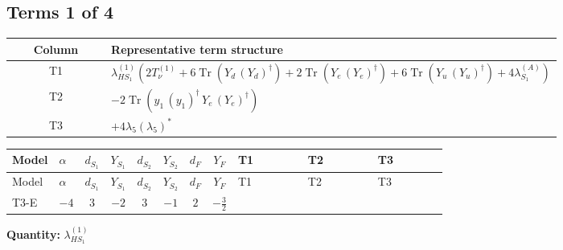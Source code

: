 \documentclass[8pt]{article}
\begin{document}
\begin{landscape}
\subsection*{Terms 1 of 4}
\begin{center}
\begin{tabular}{@{}c >{\raggedright\arraybackslash}p{0.82\linewidth}@{}}
\toprule
Column & Representative term structure \\
\midrule
T1 & \(\displaystyle {\lambda_{HS_1}^{(1)}} (2 T_{\nu}^{(1)}+6 \operatorname{Tr}\!\left({Y_d}\,\left({Y_d}\right)^{\dagger}\right)+2 \operatorname{Tr}\!\left({Y_e}\,\left({Y_e}\right)^{\dagger}\right)+6 \operatorname{Tr}\!\left({Y_u}\,\left({Y_u}\right)^{\dagger}\right)+4 {\lambda_{S_1}^{(A)}})\) \\
\midrule
T2 & \(\displaystyle -2 \operatorname{Tr}\!\left({y_1}\,\left({y_1}\right)^{\dagger}\,{Y_e}\,\left({Y_e}\right)^{\dagger}\right)\) \\
\midrule
T3 & \(\displaystyle +4 {\lambda_5} \left({\lambda_5}\right)^{*}\) \\
\midrule
\bottomrule
\end{tabular}
\end{center}
\smallskip
\tiny
\begin{longtable}{@{}llcccccc >{\raggedright\arraybackslash}p{0.21\linewidth} >{\raggedright\arraybackslash}p{0.21\linewidth} >{\raggedright\arraybackslash}p{0.21\linewidth}@{}}
\toprule
Model & $\alpha$ & $d_{S_1}$ & $Y_{S_1}$ & $d_{S_2}$ & $Y_{S_2}$ & $d_F$ & $Y_F$ & T1 & T2 & T3 \\
\midrule
\endfirsthead
\toprule
Model & $\alpha$ & $d_{S_1}$ & $Y_{S_1}$ & $d_{S_2}$ & $Y_{S_2}$ & $d_F$ & $Y_F$ & T1 & T2 & T3 \\
\midrule
\endhead
T3-E & $-4$ & $3$ & $-2$ & $3$ & $-1$ & $2$ & $-\frac{3}{2}$ & \scriptsize\adjustbox{max width=\linewidth}{$\begin{gathered} {\lambda_{HS_1}^{(1)}} (2 T_{\nu}^{(1)}+6 \operatorname{Tr}\!\left({Y_d}\,\left({Y_d}\right)^{\dagger}\right)+2 \operatorname{Tr}\!\left({Y_e}\,\left({Y_e}\right)^{\dagger}\right)+6 \operatorname{Tr}\!\left({Y_u}\,\left({Y_u}\right)^{\dagger}\right)+4 {\lambda_{S_1}^{(A)}})\end{gathered}$} & \scriptsize\adjustbox{max width=\linewidth}{$\begin{gathered} -2 \operatorname{Tr}\!\left({y_1}\,\left({y_1}\right)^{\dagger}\,{Y_e}\,\left({Y_e}\right)^{\dagger}\right)\end{gathered}$} & \scriptsize\adjustbox{max width=\linewidth}{$\begin{gathered} +4 {\lambda_5} \left({\lambda_5}\right)^{*}\end{gathered}$} \\
\midrule
\bottomrule
\end{longtable}
\clearpage
\noindent\textbf{Quantity: }$\lambda_{HS_1}^{(1)}$\par\smallskip

\end{landscape}
\end{document}
